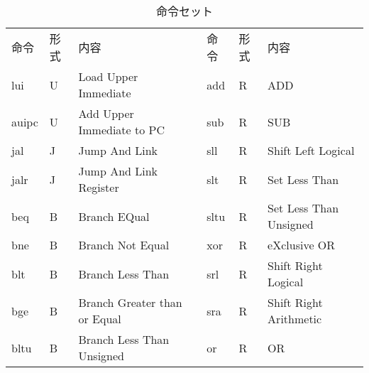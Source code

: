 \documentclass[./specs.tex]{subfiles}
\begin{document}
    \begin{table*}[h]
    \caption{命令セット}
    \label{table:instructions}
    \begin{tabular}{|l|l|l|llll}
    \cline{1-3} \cline{5-7}
    命令  & 形式 & 内容                                    & \multicolumn{1}{l|}{} & \multicolumn{1}{l|}{命令}   & \multicolumn{1}{l|}{形式} & \multicolumn{1}{l|}{内容}                         \\ \cline{1-3} \cline{5-7}
    lui   & U    & Load Upper Immediate                    & \multicolumn{1}{l|}{} & \multicolumn{1}{l|}{add}    & \multicolumn{1}{l|}{R}    & \multicolumn{1}{l|}{ADD}                          \\
    auipc & U    & Add Upper Immediate to PC               & \multicolumn{1}{l|}{} & \multicolumn{1}{l|}{sub}    & \multicolumn{1}{l|}{R}    & \multicolumn{1}{l|}{SUB}                          \\
    jal   & J    & Jump And Link                           & \multicolumn{1}{l|}{} & \multicolumn{1}{l|}{sll}    & \multicolumn{1}{l|}{R}    & \multicolumn{1}{l|}{Shift Left Logical}           \\
    jalr  & J    & Jump And Link Register                  & \multicolumn{1}{l|}{} & \multicolumn{1}{l|}{slt}    & \multicolumn{1}{l|}{R}    & \multicolumn{1}{l|}{Set Less Than}                \\
    beq   & B    & Branch EQual                            & \multicolumn{1}{l|}{} & \multicolumn{1}{l|}{sltu}   & \multicolumn{1}{l|}{R}    & \multicolumn{1}{l|}{Set Less Than Unsigned}       \\
    bne   & B    & Branch Not Equal                        & \multicolumn{1}{l|}{} & \multicolumn{1}{l|}{xor}    & \multicolumn{1}{l|}{R}    & \multicolumn{1}{l|}{eXclusive OR}                 \\
    blt   & B    & Branch Less Than                        & \multicolumn{1}{l|}{} & \multicolumn{1}{l|}{srl}    & \multicolumn{1}{l|}{R}    & \multicolumn{1}{l|}{Shift Right Logical}          \\
    bge   & B    & Branch Greater than or Equal            & \multicolumn{1}{l|}{} & \multicolumn{1}{l|}{sra}    & \multicolumn{1}{l|}{R}    & \multicolumn{1}{l|}{Shift Right Arithmetic}       \\
    bltu  & B    & Branch Less Than Unsigned               & \multicolumn{1}{l|}{} & \multicolumn{1}{l|}{or}     & \multicolumn{1}{l|}{R}    & \multicolumn{1}{l|}{OR}                           \\

\end{tabular}
\end{table*}
\end{document}
